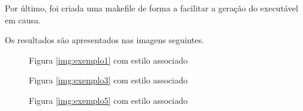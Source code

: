 \documentclass[11pt,a4paper]{report}
\begin{document}
Por último, foi criada uma makefile de forma a facilitar a geração do executável em causa.

Os resultados são apresentados nas imagens seguintes.

\begin{figure}[H]
\centering
{}
\caption{Figura \ref{img:exemplo1} com estilo associado}
\label{img:exemplo2}
\end{figure}

\begin{figure}[H]
\centering
{}
\caption{Figura \ref{img:exemplo3} com estilo associado}
\label{img:exemplo4}
\end{figure}

\begin{figure}[H]
\centering
{}
\caption{Figura \ref{img:exemplo5} com estilo associado}
\label{img:exemplo6}
\end{figure}
\end{document}
